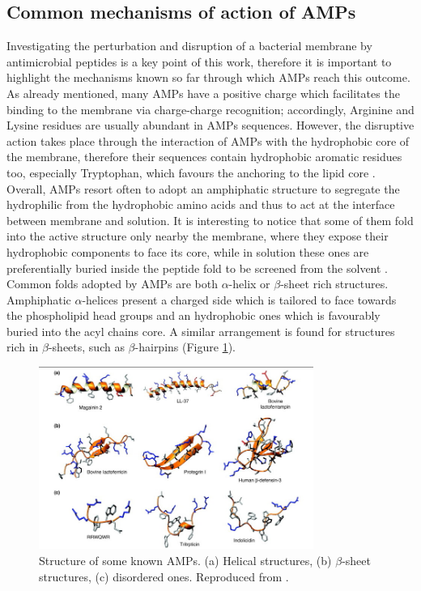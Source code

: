 \subsection{Common mechanisms of action of AMPs} \label{AMP_mechs}
Investigating the perturbation and disruption of a bacterial membrane by antimicrobial peptides is a key point of this work, therefore it is important to highlight the mechanisms known so far through which AMPs reach this outcome.
%
As already mentioned, many AMPs have a positive charge which facilitates the binding to the membrane via charge-charge recognition; accordingly, Arginine and Lysine residues are usually abundant in AMPs sequences. However, the disruptive action takes place through the interaction of AMPs with the hydrophobic core of the membrane, therefore their sequences contain hydrophobic aromatic residues too, especially Tryptophan, which favours the anchoring to the lipid core \citep{Chan2006}.
%
Overall, AMPs resort often to adopt an amphiphatic structure to segregate the hydrophilic from the hydrophobic amino acids and thus to act at the interface between membrane and solution. It is interesting to notice that some of them fold into the active structure only nearby the membrane, where they expose their hydrophobic components to face its core, while in solution these ones are preferentially buried inside the peptide fold to be screened from the solvent \citep{Nguyen2011}.
%
Common folds adopted by AMPs are both $\alpha$-helix or $\beta$-sheet rich structures. Amphiphatic $\alpha$-helices present a charged side which is tailored to face towards the phospholipid head groups and an hydrophobic ones which is favourably buried into the acyl chains core.
%
A similar arrangement is found for structures rich in $\beta$-sheets, such as $\beta$-hairpins (Figure \ref{fig:amp_structure}).


\begin{figure}[t!]
\begin{center}
\includegraphics[width = 0.8\textwidth]{1introduction/pics/AMP_many.jpg}
\caption[Structure of some known AMPs.]{Structure of some known AMPs. (a) Helical structures, (b) $\beta$-sheet structures, (c) disordered ones. Reproduced from \citep{Nguyen2011}.} \label{fig:amp_structure}
\end{center}
\end{figure}


